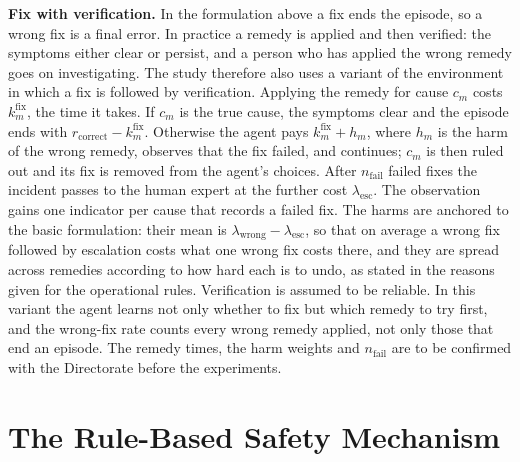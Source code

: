 \textbf{Fix with verification.} In the formulation above a fix ends the episode, so a wrong fix is a final error. In practice a remedy is applied and then verified: the symptoms either clear or persist, and a person who has applied the wrong remedy goes on investigating. The study therefore also uses a variant of the environment in which a fix is followed by verification. Applying the remedy for cause $c_m$ costs $k^{\text{fix}}_m$, the time it takes. If $c_m$ is the true cause, the symptoms clear and the episode ends with $r_{\text{correct}} - k^{\text{fix}}_m$. Otherwise the agent pays $k^{\text{fix}}_m + h_m$, where $h_m$ is the harm of the wrong remedy, observes that the fix failed, and continues; $c_m$ is then ruled out and its fix is removed from the agent's choices. After $n_{\text{fail}}$ failed fixes the incident passes to the human expert at the further cost $\lambda_{\text{esc}}$. The observation gains one indicator per cause that records a failed fix. The harms are anchored to the basic formulation: their mean is $\lambda_{\text{wrong}} - \lambda_{\text{esc}}$, so that on average a wrong fix followed by escalation costs what one wrong fix costs there, and they are spread across remedies according to how hard each is to undo, as stated in the reasons given for the operational rules. Verification is assumed to be reliable. In this variant the agent learns not only whether to fix but which remedy to try first, and the wrong-fix rate counts every wrong remedy applied, not only those that end an episode. The remedy times, the harm weights and $n_{\text{fail}}$ are to be confirmed with the Directorate before the experiments.

\section{The Rule-Based Safety Mechanism}
\label{sec:mechanism}

